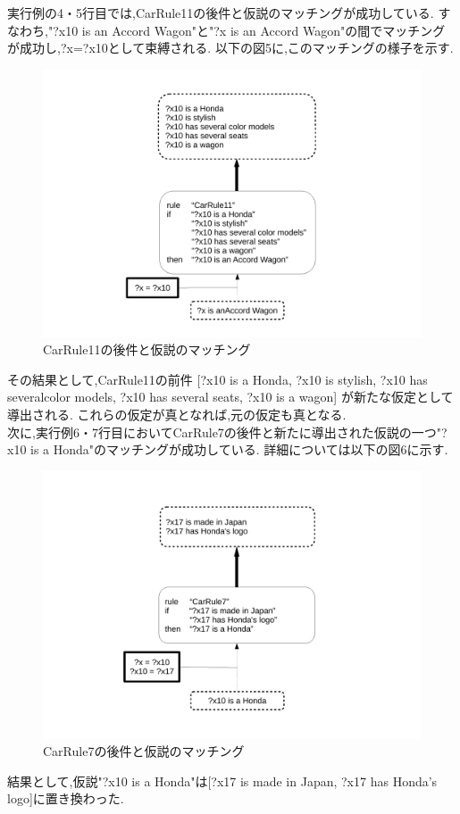 \documentclass[uplatex,12pt]{jsarticle}
\begin{document}
実行例の4・5行目では,CarRule11の後件と仮説のマッチングが成功している.
すなわち,"?x10 is an Accord Wagon"と"?x is an Accord Wagon"の間でマッチングが成功し,?x=?x10として束縛される.
以下の図5に,このマッチングの様子を示す.
\begin{figure}[!hbt]
    \centering
    \includegraphics[scale=0.30]{images/backward_chaining_1.pdf}
    \caption{CarRule11の後件と仮説のマッチング}
\end{figure}
その結果として,CarRule11の前件
[?x10 is a Honda, ?x10 is stylish, ?x10 has severalcolor models, ?x10 has several seats, ?x10 is a wagon]
が新たな仮定として導出される.
これらの仮定が真となれば,元の仮定も真となる. \\

次に,実行例6・7行目においてCarRule7の後件と新たに導出された仮説の一つ"?x10 is a Honda"のマッチングが成功している.
詳細については以下の図6に示す.
\begin{figure}[!hbt]
    \centering
    \includegraphics[scale=0.30]{images/backward_chaining_2.pdf}
    \caption{CarRule7の後件と仮説のマッチング}
\end{figure}
結果として,仮説"?x10 is a Honda"は[?x17 is made in Japan, ?x17 has Honda's logo]に置き換わった. \\
\end{document}
